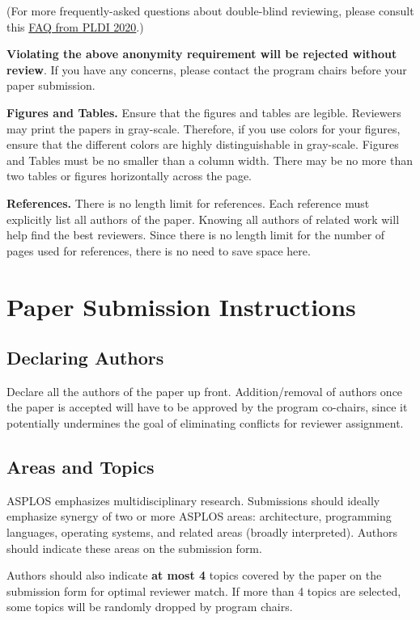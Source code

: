 \documentclass[pageno]{jpaper}
\begin{document}
(For more frequently-asked questions about double-blind reviewing, please 
consult this 
\href{https://pldi20.sigplan.org/track/pldi-2020-papers#FAQ-on-Double-Blind-Reviewing}
{FAQ from PLDI 2020}.)

\textbf{Violating the above anonymity requirement will be rejected without review}. If you have any concerns, please contact the program chairs before your paper submission.

\noindent\textbf{Figures and Tables.} Ensure that the figures and tables
are legible. 
Reviewers may print the papers in gray-scale. Therefore, if you use
colors for your figures, ensure that the different colors are highly
distinguishable in gray-scale. Figures and Tables must be no smaller than a column width.  There may be no more than two tables or figures horizontally across the page.

\noindent\textbf{References.}  There is no length limit for references.
Each reference must explicitly list all authors of the paper.
Knowing all authors of related
work will help find the best reviewers. Since there is no length limit
for the number of pages used for references, there is no need to save space
here.


\section{Paper Submission Instructions}

\subsection{Declaring Authors}

Declare all the authors of the paper up front. Addition/removal of authors
once the paper is accepted will have to be approved by the program co-chairs,
since it potentially undermines the goal of eliminating conflicts for
reviewer assignment.

\subsection{Areas and Topics}

ASPLOS emphasizes multidisciplinary research. Submissions should ideally
emphasize synergy of two or more ASPLOS areas: architecture, programming
languages, operating systems, and related areas (broadly
interpreted). Authors should indicate these areas on the submission form.

Authors should also indicate \textbf{at most 4}
topics covered by the paper on the submission form 
for optimal reviewer match. If more than 4 topics are selected, some topics
will be randomly dropped by program chairs.
\end{document}
